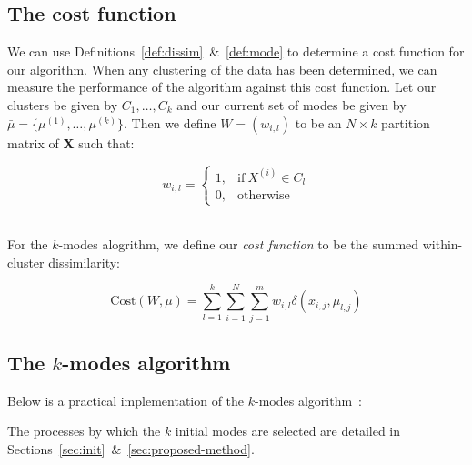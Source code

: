 \subsection{The cost function}\label{subsec:cost}

We can use Definitions~\ref{def:dissim}~\&~\ref{def:mode} to determine a cost 
function for our algorithm. When any clustering of the data has been determined,
we can measure the performance of the algorithm against this cost function. Let
our clusters be given by \(C_1, \ldots, C_k\) and our current set of modes be
given by \(\bar{\mu} = \{\mu^{(1)}, \ldots, \mu^{(k)}\}\). Then we define \(W =
(w_{i, l})\) to be an \(N \times k\) partition matrix of \textbf{X} such that:

\[ 
    w_{i,l} = \begin{cases}
                1, & \text{if} \ X^{(i)} \in C_l \\
                0, & \text{otherwise}
              \end{cases}
\]\\

\begin{definition}\label{def:cost}
    For the \(k\)-modes alogrithm, we define our \emph{cost function} to be the 
    summed within-cluster dissimilarity:

    \[
        \text{Cost}(W, \bar{\mu}) = \sum_{l=1}^{k} \sum_{i=1}^{N} \sum_{j=1}^{m}
        w_{i,l} \delta(x_{i,j}, \mu_{l,j})
    \]
\end{definition}


\subsection{The \(k\)-modes algorithm}\label{subsec:kmodes}

Below is a practical implementation of the \(k\)-modes algorithm~\cite{Huang98}:




\begin{remark}
    The processes by which the \(k\) initial modes are selected are detailed in 
    Sections~\ref{sec:init}~\&~\ref{sec:proposed-method}.
\end{remark}

